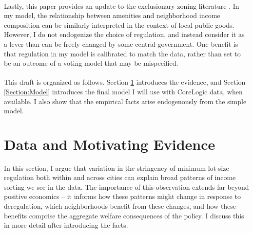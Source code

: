 \documentclass[]{article}
\begin{document}
	\paragraph*{}
	Lastly, this paper provides an update to the exclusionary zoning literature \citep{hamilton1976, calabresetal, keepingpeopleout, ineffTiebout, barcoate}. In my model, the relationship between amenities and neighborhood income composition can be similarly interpreted in the context of local public goods. However, I do not endogenize the choice of regulation, and instead consider it as a lever than can be freely changed by some central government. One benefit is that regulation in my model is calibrated to match the data, rather than set to be an outcome of a voting model that may be mispecified.
	
	\paragraph*{}
	This draft is organized as follows. Section \ref{Section:Evidence} introduces the evidence, and Section \ref{Section:Model} introduces the final model I will use with CoreLogic data, when available. I also show that the empirical facts arise endogenously from the simple model. 


	\section{Data and Motivating Evidence}\label{Section:Evidence}

	\paragraph*{}
	In this section, I argue that variation in the stringency of minimum lot size regulation both within and across cities can explain broad patterns of income sorting we see in the data. The importance of this observation extends far beyond positive economics -- it informs how these patterns might change in response to deregulation, which neighborhoods benefit from these changes, and how these benefits comprise the aggregate welfare consequences of the policy. I discuss this in more detail after introducing the facts. 
	
\end{document}
